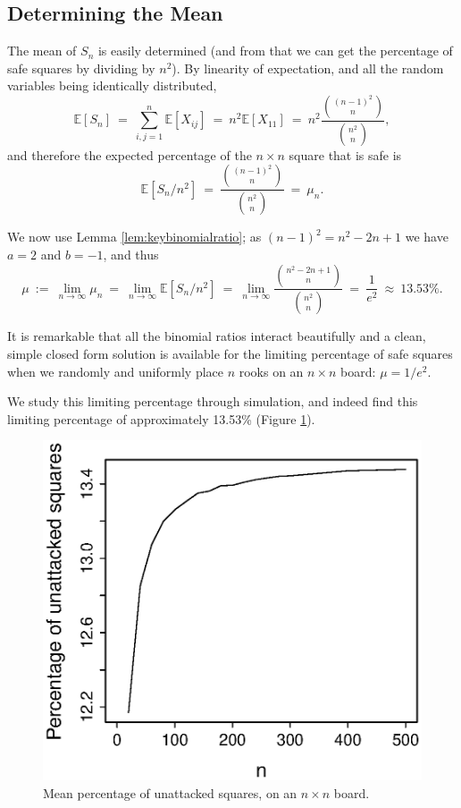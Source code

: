 \documentclass[12pt,reqno]{amsart}
\newcommand{\E}{\mathbb{E}}
\renewcommand{\E}{\mathbb{E}}
\numberwithin{equation}{section}
\theoremstyle{plain}
\newcommand\be{\begin{equation}}
\newcommand\ee{\end{equation}}
\newcommand{\ncr}[2]{{#1 \choose #2}}
\begin{document}
\subsection{Determining the Mean}

The mean of $S_n$ is easily determined (and from that we can get the percentage of safe squares by dividing by $n^2$). By linearity of expectation, and all the random variables being identically distributed,
\be \E[S_n]\ =\ \sum_{i,j=1}^n \E[X_{ij}] \ = \ n^2 \E[X_{11}] \ = \ n^2 \frac{\ncr{(n-1)^2}{n}}{\ncr{n^2}{n}}, \ee and therefore the expected percentage of the $n\times n$ square that is safe is \be \E[S_n / n^2] \ = \  \frac{\ncr{(n-1)^2}{n}}{\ncr{n^2}{n}} \ = \ \mu_n. \ee

We now use Lemma \ref{lem:keybinomialratio}; as $(n-1)^2 = n^2 - 2n + 1$ we have $a=2$ and $b=-1$, and thus \be \mu \ := \ \lim_{n\to\infty} \mu_n \ = \ \lim_{n\to\infty} \E[S_n / n^2] \ = \  \lim_{n\rightarrow \infty} \frac{\ncr{n^2-2n+1}{n}}{\ncr{n^2}{n}}\ =\ \frac{1}{e^2} \ \approx \ 13.53\%. \ee

It is remarkable that all the binomial ratios interact beautifully and a clean, simple closed form solution is available for the limiting percentage of safe squares when we randomly and uniformly place $n$ rooks on an $n\times n$ board: $\mu = 1/e^2$.

We study this limiting percentage through simulation, and indeed find this limiting percentage of approximately 13.53\% (Figure \ref{fig:percentage_free}).

\begin{figure}[h]
\centering
\includegraphics[scale=0.6]{plot1_percentage_free}
\caption{Mean percentage of unattacked squares, on an $n \times n$ board.}
\label{fig:percentage_free}
\end{figure}
\end{document}
